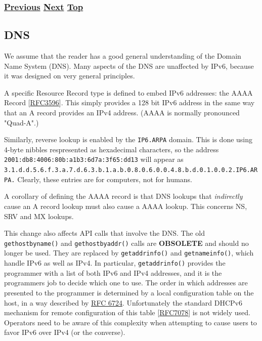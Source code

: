 \documentclass[
]{article}
\begin{document}
\subsubsection{\texorpdfstring{\hyperref[auto-configuration]{Previous}
\hyperref[dns]{Next}
\hyperref[ipv6-basic-technology]{Top}}{Previous Next Top}}\label{previous-next-top-13}

\pagebreak

\subsection{DNS}\label{dns}

We assume that the reader has a good general understanding of the Domain
Name System (DNS). Many aspects of the DNS are unaffected by IPv6,
because it was designed on very general principles.

A specific Resource Record type is defined to embed IPv6 addresses: the
AAAA Record
{[}\href{https://www.rfc-editor.org/info/rfc3596}{RFC3596}{]}. This
simply provides a 128 bit IPv6 address in the same way that an A record
provides an IPv4 address. (AAAA is normally pronounced "Quad-A".)

Similarly, reverse lookup is enabled by the \texttt{IP6.ARPA} domain.
This is done using 4-byte nibbles respresented as hexadecimal
characters, so the address
\texttt{2001:db8:4006:80b:a1b3:6d7a:3f65:dd13} will appear as
\texttt{3.1.d.d.5.6.f.3.a.7.d.6.3.b.1.a.b.0.8.0.6.0.0.4.8.b.d.0.1.0.0.2.IP6.ARPA.}
Clearly, these entries are for computers, not for humans.

A corollary of defining the AAAA record is that DNS lookups that
\emph{indirectly} cause an A record lookup must also cause a AAAA
lookup. This concerns NS, SRV and MX lookups.

This change also affects API calls that involve the DNS. The old
\texttt{gethostbyname()} and \texttt{gethostbyaddr()} calls are
\textbf{OBSOLETE} and should no longer be used. They are replaced by
\texttt{getaddrinfo()} and \texttt{getnameinfo()}, which handle IPv6 as
well as IPv4. In particular, \texttt{getaddrinfo()} provides the
programmer with a list of both IPv6 and IPv4 addresses, and it is the
programmer\textquotesingle s job to decide which one to use. The order
in which addresses are presented to the programmer is determined by a
local configuration table on the host, in a way described by
\href{https://www.rfc-editor.org/info/rfc6724}{RFC 6724}. Unfortunately
the standard DHCPv6 mechanism for remote configuration of this table
{[}\href{https://www.rfc-editor.org/info/rfc7078}{RFC7078}{]} is not
widely used. Operators need to be aware of this complexity when
attempting to cause users to favor IPv6 over IPv4 (or the converse).
\end{document}
